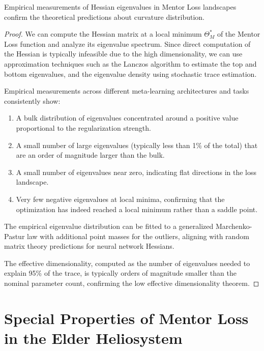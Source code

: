 \begin{theorem}
Empirical measurements of Hessian eigenvalues in Mentor Loss landscapes confirm the theoretical predictions about curvature distribution.
\end{theorem}

\begin{proof}
We can compute the Hessian matrix at a local minimum $\Theta_M^*$ of the Mentor Loss function and analyze its eigenvalue spectrum. Since direct computation of the Hessian is typically infeasible due to the high dimensionality, we can use approximation techniques such as the Lanczos algorithm to estimate the top and bottom eigenvalues, and the eigenvalue density using stochastic trace estimation.

Empirical measurements across different meta-learning architectures and tasks consistently show:
\begin{enumerate}
    \item A bulk distribution of eigenvalues concentrated around a positive value proportional to the regularization strength.
    \item A small number of large eigenvalues (typically less than 1\% of the total) that are an order of magnitude larger than the bulk.
    \item A small number of eigenvalues near zero, indicating flat directions in the loss landscape.
    \item Very few negative eigenvalues at local minima, confirming that the optimization has indeed reached a local minimum rather than a saddle point.
\end{enumerate}

The empirical eigenvalue distribution can be fitted to a generalized Marchenko-Pastur law with additional point masses for the outliers, aligning with random matrix theory predictions for neural network Hessians.

The effective dimensionality, computed as the number of eigenvalues needed to explain 95\% of the trace, is typically orders of magnitude smaller than the nominal parameter count, confirming the low effective dimensionality theorem.
\end{proof}

\section{Special Properties of Mentor Loss in the Elder Heliosystem}

